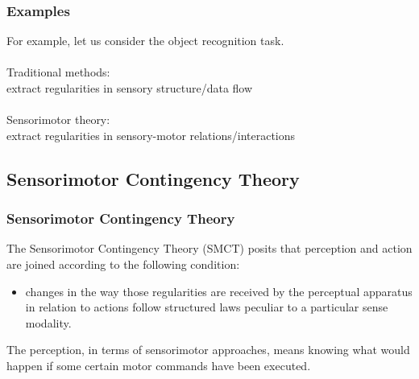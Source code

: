 \documentclass{beamer}
\begin{document}
\begin{frame}
\frametitle{Examples}
For example, let us consider the object recognition task.
\\~\\


Traditional methods:\\ 
extract regularities in sensory structure/data flow 
\\~\\


Sensorimotor theory:\\
extract regularities in sensory-motor relations/interactions


\end{frame}






\subsection{Sensorimotor Contingency Theory} %
\begin{frame}
\frametitle{Sensorimotor Contingency Theory}


The Sensorimotor Contingency Theory (SMCT) posits that perception and action are joined according to the following condition:
\begin{itemize}
\item changes in the way those regularities are received by the perceptual apparatus in relation to actions follow structured laws peculiar to a particular sense modality.
\end{itemize}


The perception, in terms of sensorimotor approaches, means knowing what would happen if some certain motor commands have been executed. 

\end{frame}
\end{document}
